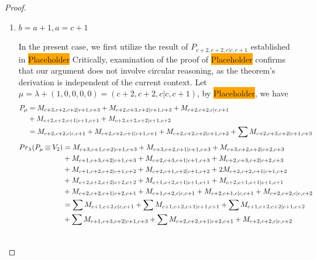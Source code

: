 \begin{proof}
\begin{enumerate}
\begin{enumerate}
      \item $ b=a+1,a=c+1 $\par
        In the present case, we first utilize the result of $P_{c+2,c+2,c|c,c+1}$ established in \colorbox{orange}{Placeholder} Critically, examination of the proof of \colorbox{orange}{Placeholder} confirms that our argument does not involve circular reasoning, as the theorem's derivation is independent of the current context. Let $\mu = \lambda + (1,0,0,0,0) =(c+2,c+2,c|c,c+1) $, by \colorbox{orange}{Placeholder}, we have
        \begin{equation}\notag
          \begin{aligned}
            P_\mu &=
M_{c+3,c+2,c+2|c+1,c+3}
+M_{c+2,c+3,c+2|c+1,c+3}
+M_{c+2,c+2,c|c,c+1}\\ 
                                              &
+M_{c+2,c+2,c+1|c+1,c+1}
+M_{c+2,c+2,c+2|c+1,c+2}\\
                  &=
 M_{c+2,c+2,c|c,c+1}
+ M_{c+2,c+2,c+1|c+1,c+1}
+ M_{c+2,c+2,c+2|c+1,c+2}
+\sum M_{c+2,c+3,c+2|c+1,c+3}
          \end{aligned}
        \end{equation}
        \begin{equation}\notag
          \begin{aligned}
            Pr_{\lambda}(P_\mu \otimes V_{2}) &=
M_{c+3,c+1,c+2|c+1,c+3}
+ M_{c+3,c+2,c+1|c+1,c+3}
+ M_{c+3,c+2,c+2|c+2,c+3}\\ 
                                              &
+ M_{c+1,c+3,c+2|c+1,c+3}
+ M_{c+2,c+3,c+1|c+1,c+3}
+ M_{c+2,c+3,c+2|c+2,c+3}\\ 
                                              &
+ M_{c+1,c+2,c+2|c+1,c+2}
+ M_{c+2,c+1,c+2|c+1,c+2}
+ 2M_{c+2,c+2,c+1|c+1,c+2}\\ 
                                              &
+ M_{c+2,c+2,c+2|c+2,c+2}
+ M_{c+1,c+2,c+1|c+1,c+1}
+ M_{c+2,c+1,c+1|c+1,c+1}\\ 
                                              &
+ M_{c+2,c+2,c+1|c+2,c+1}
+ M_{c+1,c+2,c|c,c+1}
+ M_{c+2,c+1,c|c,c+1}
+ M_{c+2,c+2,c|c,c+2} \\
                                               &=
\sum M_{c+1,c+2,c|c,c+1}
+ \sum M_{c+1,c+2,c+1|c+1,c+1}
+ \sum M_{c+1,c+2,c+2|c+1,c+2}\\ 
                                              &
+ \sum M_{c+1,c+3,c+2|c+1,c+3}
+ \sum M_{c+2,c+2,c+1|c+2,c+1}
+  M_{c+2,c+2,c|c,c+2}\\ 
                                              &

\end{aligned}
\end{equation}
\end{enumerate}
\end{enumerate}
\end{proof}
